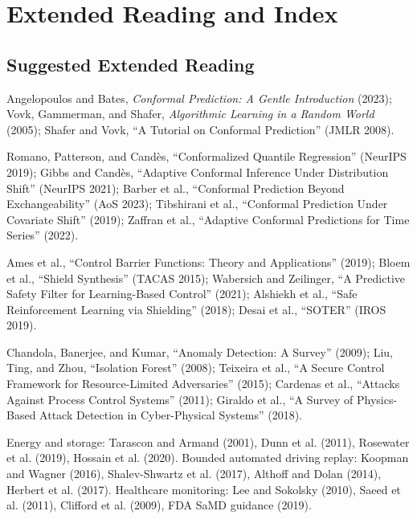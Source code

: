 \chapter*{Extended Reading and Index}

\section*{Suggested Extended Reading}

\begin{description}[style=nextline]

\item[Universal Safety Foundations]
  Angelopoulos and Bates, \emph{Conformal Prediction: A Gentle Introduction} (2023);
  Vovk, Gammerman, and Shafer, \emph{Algorithmic Learning in a Random World} (2005);
  Shafer and Vovk, ``A Tutorial on Conformal Prediction'' (JMLR 2008).

\item[Conformal Prediction and Calibration]
  Romano, Patterson, and Cand\`{e}s, ``Conformalized Quantile Regression'' (NeurIPS 2019);
  Gibbs and Cand\`{e}s, ``Adaptive Conformal Inference Under Distribution Shift'' (NeurIPS 2021);
  Barber et al., ``Conformal Prediction Beyond Exchangeability'' (AoS 2023);
  Tibshirani et al., ``Conformal Prediction Under Covariate Shift'' (2019);
  Zaffran et al., ``Adaptive Conformal Predictions for Time Series'' (2022).

\item[Runtime Assurance and Safe Control]
  Ames et al., ``Control Barrier Functions: Theory and Applications'' (2019);
  Bloem et al., ``Shield Synthesis'' (TACAS 2015);
  Wabersich and Zeilinger, ``A Predictive Safety Filter for Learning-Based Control'' (2021);
  Alshiekh et al., ``Safe Reinforcement Learning via Shielding'' (2018);
  Desai et al., ``SOTER'' (IROS 2019).

\item[Degraded Observation and CPS Trust]
  Chandola, Banerjee, and Kumar, ``Anomaly Detection: A Survey'' (2009);
  Liu, Ting, and Zhou, ``Isolation Forest'' (2008);
  Teixeira et al., ``A Secure Control Framework for Resource-Limited Adversaries'' (2015);
  Cardenas et al., ``Attacks Against Process Control Systems'' (2011);
  Giraldo et al., ``A Survey of Physics-Based Attack Detection in Cyber-Physical Systems'' (2018).

\item[Three Evidence Lanes]
  Energy and storage: Tarascon and Armand (2001), Dunn et al. (2011), Rosewater et al. (2019), Hossain et al. (2020).
  Bounded automated driving replay: Koopman and Wagner (2016), Shalev-Shwartz et al. (2017), Althoff and Dolan (2014), Herbert et al. (2017).
  Healthcare monitoring: Lee and Sokolsky (2010), Saeed et al. (2011), Clifford et al. (2009), FDA SaMD guidance (2019).


\end{description}
